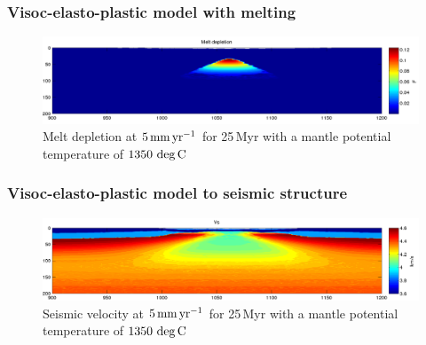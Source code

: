 \documentclass[aspectratio=169]{beamer}
\begin{document}
\begin{frame}
    \frametitle{Visoc-elasto-plastic model with melting}
    \begin{figure}
        \includegraphics[width=0.8\paperwidth]{./figures/MESS2.png}
        \caption{Melt depletion at $5\rm\,mm\,yr^{-1}$ for 25\,Myr with a mantle potential temperature of $1350\,\deg\rm C$}
    \end{figure}
\end{frame}

\begin{frame}
    \frametitle{Visoc-elasto-plastic model to seismic structure}
    \begin{figure}
        \includegraphics[width=0.8\paperwidth]{./figures/MER1.png}
        \caption{Seismic velocity at $5\rm\,mm\,yr^{-1}$ for 25\,Myr with a mantle potential temperature of $1350\,\deg\rm C$}
    \end{figure}
\end{frame}
\end{document}
